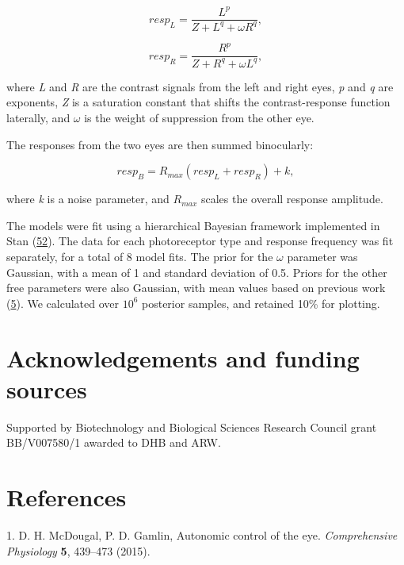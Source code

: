 \documentclass[
]{article}
\begin{document}
\begin{equation}
\label{eq:respL}
resp_L = \frac{L^p}{Z + L^q + \omega R^q},
\end{equation}

\begin{equation}
\label{eq:respR}
resp_R = \frac{R^p}{Z + R^q + \omega L^q},
\end{equation}

\noindent where \emph{L} and \emph{R} are the contrast signals from the left and right eyes, \emph{p} and \emph{q} are exponents, \emph{Z} is a saturation constant that shifts the contrast-response function laterally, and \(\omega\) is the weight of suppression from the other eye.

The responses from the two eyes are then summed binocularly:

\begin{equation}
\label{eq:respB}
resp_B = R_{max}(resp_L + resp_R) + k,
\end{equation}

\noindent where \emph{k} is a noise parameter, and \(R_{max}\) scales the overall response amplitude.

The models were fit using a hierarchical Bayesian framework implemented in Stan (\protect\hyperlink{ref-Carpenter2017}{52}). The data for each photoreceptor type and response frequency was fit separately, for a total of 8 model fits. The prior for the \(\omega\) parameter was Gaussian, with a mean of 1 and standard deviation of 0.5. Priors for the other free parameters were also Gaussian, with mean values based on previous work (\protect\hyperlink{ref-Segala2023}{5}). We calculated over \ensuremath{10^{6}} posterior samples, and retained 10\% for plotting.

\hypertarget{acknowledgements-and-funding-sources}{%
\section{Acknowledgements and funding sources}\label{acknowledgements-and-funding-sources}}

Supported by Biotechnology and Biological Sciences Research Council grant BB/V007580/1 awarded to DHB and ARW.

\hypertarget{references}{%
\section{References}\label{references}}

\hypertarget{refs}{}
\leavevmode\hypertarget{ref-McDougal2015}{}%
1. D. H. McDougal, P. D. Gamlin, Autonomic control of the eye. \emph{Comprehensive Physiology} \textbf{5}, 439--473 (2015).
\end{document}
